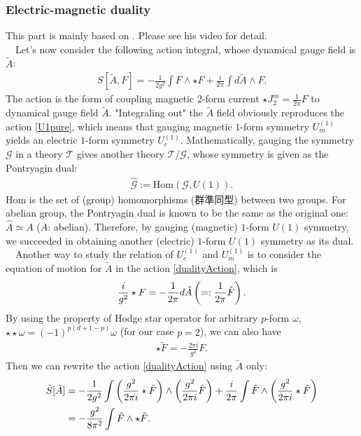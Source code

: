 \documentclass{ltjsarticle}
\theoremstyle{mystyle} %
\numberwithin{equation}{section}
\begin{document}
\subsubsection{Electric-magnetic duality}
This part is mainly based on \cite{TD}. Please see his video for detail. \\
　Let's now consider the following action integral, whose dynamical gauge field is $\tilde{A}$:
\begin{align}
    S[\tilde{A}, F]
    =-\frac{1}{2g^2}\int F\wedge \star F + \frac{i}{2\pi}\int d\tilde{A}\wedge F. 
\label{dualityAction}
\end{align}
The action is the form of coupling magnetic $2$-form current $\star J^{m}_2 = \frac{1}{2\pi}F$ to dynamical gauge field $\tilde{A}$. 
"Integraling out" the $\tilde{A}$ field obviously reproduces the action \eqref{U1pure}, 
which means that gauging magnetic $1$-form symmetry $U^{(1)}_m$ yields an electric $1$-form symmetry $U^{(1)}_e$. 
Mathematically, gauging the symmetry $\mathcal{G}$ in a theory $\mathcal{T}$ gives 
another theory $\mathcal{T}/\mathcal{G}$, whose symmetry is given as the Pontryagin dual: 
\begin{align}
    \hat{\mathcal{G}}:= \mathrm{Hom}(\mathcal{G}, U(1)). 
\end{align}
$\mathrm{Hom}$ is the set of (group) homomorphisms (群準同型) between two groups. 
For abelian group, the Pontryagin dual is known to be the same as the original one: 
$\hat{A}\simeq A$ ($A$: abelian). 
Therefore, by gauging (magnetic) $1$-form $U(1)$ symmetry, 
we succeeded in obtaining another (electric) $1$-form $U(1)$ symmetry as its dual. 
\\
　Another way to study the relation of $U^{(1)}_e$ and $U^{(1)}_m$ is to consider the equation of motion for $\tilde{A}$ in the action \eqref{dualityAction}, 
which is
\begin{align}
    \frac{i}{g^2}\star F = -\frac{1}{2\pi}d\tilde{A} \left({=: \frac{1}{2\pi}\tilde{F}}\right). 
\end{align}
By using the property of Hodge star operator for arbitrary $p$-form $\omega$, 
$\star\star \omega = (-1)^{p(d+1-p)}\omega$ (for our case $p=2$), we can also have
\begin{align}
    \star \tilde{F}= -\frac{2\pi i}{g^2}F. 
\end{align}
Then we can rewrite the action \eqref{dualityAction} using $\tilde{A}$ only: 
\begin{align}
    \tilde{S}[\tilde{A}]
    &=-\frac{1}{2g^2}\int \left({\frac{g^2}{2\pi i}\star \tilde{F}}\right)\wedge \left({\frac{g^2}{2\pi i}\tilde{F}}\right) + \frac{i}{2\pi}\int \tilde{F}\wedge \left({\frac{g^2}{2\pi i}\star \tilde{F}}\right)\\
    &=-\frac{g^2}{8\pi^2}\int \tilde{F}\wedge \star \tilde{F}. 
\end{align}
\end{document}
